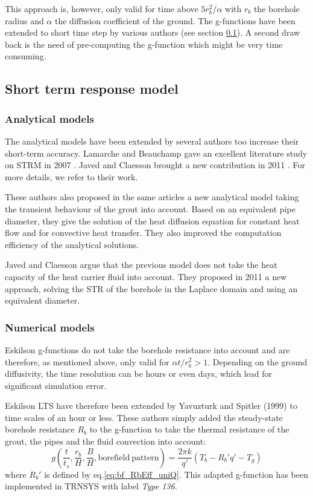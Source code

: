 \documentclass[a4paper,oneside,11pt]{report}
\begin{document}
This approach is, however, only valid for time above $5 r_b^2 / \alpha$ with $r_b$ the borehole radius and $\alpha$ the diffusion coefficient of the ground. The g-functions have been extended to short time step by various authors (see section \ref{ssec:bf_STR}). A second draw back is the need of pre-computing the g-function which might be very time consuming.

\subsection{Short term response model} \label{ssec:bf_STR}

\subsubsection*{Analytical models} \label{sssec:bf_STR_ana}

The analytical models have been extended by several authors too increase their short-term accuracy. Lamarche and Beauchamp gave an excellent literature study on STRM in 2007 \cite{lam07a, lam07b}. Javed and Claesson brought a new contribution in 2011 \cite{jav12}. For more details, we refer to their work.

These authors also proposed in the same articles a new analytical model taking the transient behaviour of the grout into account. Based on an equivalent pipe diameter, they give the solution of the heat diffusion equation for constant heat flow and for convective heat transfer. They also improved the computation efficiency of the analytical solutions.

Javed and Claesson argue that the previous model does not take the heat capacity of the heat carrier fluid into account. They proposed in 2011 a new approach, solving the STR of the borehole in the Laplace domain and using an equivalent diameter.

\subsubsection*{Numerical models} \label{sssec:bf_STR_num}

Eskilson g-functions do not take the borehole resistance into account and are therefore, as mentioned above, only valid for $ \alpha t / r_b^2 > 1 $. Depending on the ground diffusivity, the time resolution can be hours or even days, which lead for significant simulation error.

Eskilson LTS have therefore been extended by Yavuzturk and Spitler (1999) to time scales of an hour or less. These authors simply added the steady-state borehole resistance $R_b$ to the g-function to take the thermal resistance of the grout, the pipes and the fluid convection into account:
\begin{equation} \label{eq:bf_adaGfun}
	g \left( \frac{t}{t_s}, \frac{r_b}{H}, \frac{B}{H}, \mathrm{borefield \ pattern} \right) = \frac{2 \pi k}{q'} (T_b - R_b' q' - T_g)
\end{equation}
where $R_b'$ is defined by eq.\ref{eq:bf_RbEff_uniQ}. This adapted g-function has been implemented in TRNSYS with label \textit{Type 136}.
\end{document}
